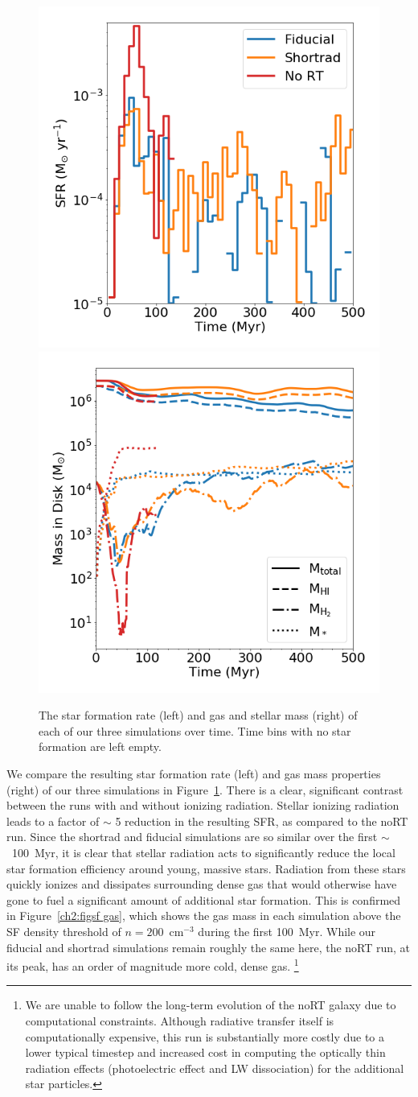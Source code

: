 \begin{figure}
\centering
\includegraphics[width=0.49\linewidth]{figures/ch2/sfr}
\includegraphics[width=0.49\linewidth]{figures/ch2/mass}
\caption{The star formation rate (left) and gas and stellar mass (right) of each of our three simulations over time. Time bins with no star formation are left empty.}
\label{ch2:figsfr_mass_evolution}
\end{figure}

We compare the resulting star formation rate (left) and gas mass properties (right) of our three simulations in Figure~\ref{ch2:figsfr_mass_evolution}. There is a clear, significant contrast between the runs with and without ionizing radiation. Stellar ionizing radiation leads to a factor of $\sim$ 5 reduction in the resulting SFR, as compared to the noRT run. Since the shortrad and fiducial simulations are so similar over the first $\sim$~100~Myr, it is clear that stellar radiation acts to significantly reduce the local star formation efficiency around young, massive stars. Radiation from these stars quickly ionizes and dissipates surrounding dense gas that would otherwise have gone to fuel a significant amount of additional star formation. This is confirmed in Figure~\ref{ch2:figsf gas}, which shows the gas mass in each simulation above the SF density threshold of $n = 200$~cm$^{-3}$ during the first 100~Myr. While our fiducial and shortrad simulations remain roughly the same here, the noRT run, at its peak, has an order of magnitude more cold, dense gas. \footnote{We are unable to follow the long-term evolution of the noRT galaxy due to computational constraints. Although radiative transfer itself is computationally expensive, this run is substantially more costly due to a lower typical timestep and increased cost in computing the optically thin radiation effects (photoelectric effect and LW dissociation) for the additional star particles.}

